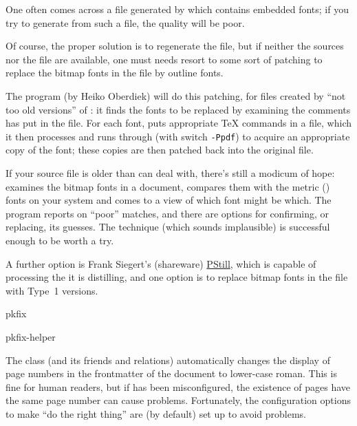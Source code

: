 
One often comes across a \PS{} file generated by
 which contains embedded  fonts; if you try
to generate  from such a file, the quality will be poor.

Of course, the proper solution is to regenerate the \PS{} file,
but if neither the sources nor the  file are available, one
must needs resort to some sort of patching to replace the bitmap fonts
in the file by outline fonts.

The program  (by Heiko Oberdiek) will do this
patching, for files created by ``not too old versions'' of
: it finds the fonts to be replaced by examining the
\PS{} comments  has put in the file.  For each
font,  puts appropriate \TeX{} commands in a file,
which it then processes and runs through  (with switch
\texttt{-Ppdf}) to acquire an appropriate copy of the font; these copies are
then patched back into the original file.

If your source file is older than  can deal with,
there's still a modicum of hope:  examines the
bitmap fonts in a document, compares them with the metric
() fonts on your system and comes to a view of which
font might be which.  The program reports on ``poor'' matches, and
there are options for confirming, or replacing, its guesses.  The
technique (which sounds implausible) is successful enough to be worth
a try.

A further option is Frank Siegert's (shareware)
\href{http://www.pstill.com}{PStill}, which is capable of processing
the \PS{} it is distilling, and one option is to replace bitmap fonts
in the file with Type~1 versions.
\begin{ctanrefs}
\item[pkfix]
\item[pkfix-helper]
\end{ctanrefs}


The  class (and its friends and relations) automatically
changes the display of page numbers in the frontmatter of the document
to lower-case roman.  This is fine for human readers, but if
 has been misconfigured, the existence of pages have
the same page number can cause problems.  Fortunately, the
configuration options to make  ``do the right
thing'' are (by default) set up to avoid problems.

